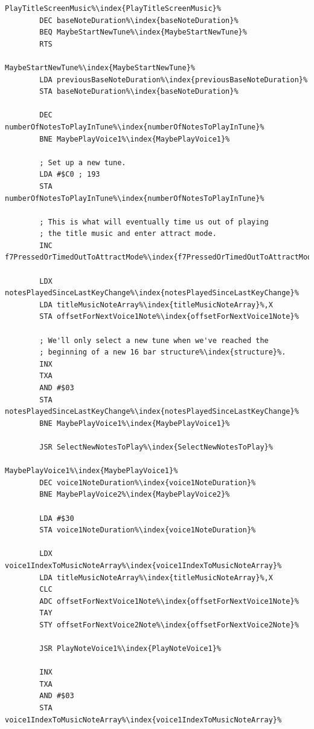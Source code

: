 \begin{lstlisting}[caption=Routine responsible for playing the title tune.,escapechar=\%]
PlayTitleScreenMusic%\index{PlayTitleScreenMusic}%
        DEC baseNoteDuration%\index{baseNoteDuration}%
        BEQ MaybeStartNewTune%\index{MaybeStartNewTune}%
        RTS

MaybeStartNewTune%\index{MaybeStartNewTune}%   
        LDA previousBaseNoteDuration%\index{previousBaseNoteDuration}%
        STA baseNoteDuration%\index{baseNoteDuration}%

        DEC numberOfNotesToPlayInTune%\index{numberOfNotesToPlayInTune}%
        BNE MaybePlayVoice1%\index{MaybePlayVoice1}%

        ; Set up a new tune.
        LDA #$C0 ; 193
        STA numberOfNotesToPlayInTune%\index{numberOfNotesToPlayInTune}%

        ; This is what will eventually time us out of playing
        ; the title music and enter attract mode.
        INC f7PressedOrTimedOutToAttractMode%\index{f7PressedOrTimedOutToAttractMode}%

        LDX notesPlayedSinceLastKeyChange%\index{notesPlayedSinceLastKeyChange}%
        LDA titleMusicNoteArray%\index{titleMusicNoteArray}%,X
        STA offsetForNextVoice1Note%\index{offsetForNextVoice1Note}%

        ; We'll only select a new tune when we've reached the
        ; beginning of a new 16 bar structure%\index{structure}%.
        INX
        TXA
        AND #$03
        STA notesPlayedSinceLastKeyChange%\index{notesPlayedSinceLastKeyChange}%
        BNE MaybePlayVoice1%\index{MaybePlayVoice1}%

        JSR SelectNewNotesToPlay%\index{SelectNewNotesToPlay}%

MaybePlayVoice1%\index{MaybePlayVoice1}%   
        DEC voice1NoteDuration%\index{voice1NoteDuration}%
        BNE MaybePlayVoice2%\index{MaybePlayVoice2}%

        LDA #$30
        STA voice1NoteDuration%\index{voice1NoteDuration}%

        LDX voice1IndexToMusicNoteArray%\index{voice1IndexToMusicNoteArray}%
        LDA titleMusicNoteArray%\index{titleMusicNoteArray}%,X
        CLC
        ADC offsetForNextVoice1Note%\index{offsetForNextVoice1Note}%
        TAY
        STY offsetForNextVoice2Note%\index{offsetForNextVoice2Note}%

        JSR PlayNoteVoice1%\index{PlayNoteVoice1}%

        INX
        TXA
        AND #$03
        STA voice1IndexToMusicNoteArray%\index{voice1IndexToMusicNoteArray}%


\end{lstlisting}
